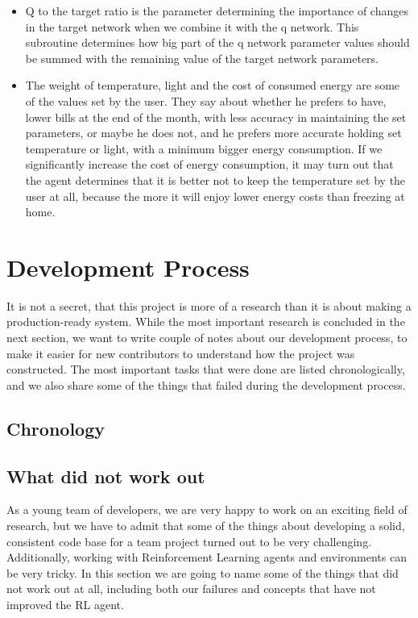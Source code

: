 \documentclass{article}
\begin{document}
\begin{itemize}
\item Q to the target ratio is the parameter determining the importance of changes in the target network when we combine it with the q network. This subroutine determines how big part of the q network parameter values should be summed with the remaining value of the target network parameters.

\item The weight of temperature, light and the cost of consumed energy are some of the values set by the user. They say about whether he prefers to have, lower bills at the end of the month, with less accuracy in maintaining the set parameters, or maybe he does not, and he prefers more accurate holding set temperature or light, with a minimum bigger energy consumption.
If we significantly increase the cost of energy consumption, it may turn out that the agent determines that it is better not to keep the temperature set by the user at all, because the more it will enjoy lower energy costs than freezing at home.
\end{itemize}

\section{Development Process}
It is not a secret, that this project is more of a research than it is about making a production-ready system. While the most important research is concluded in the next section, we want to write couple of notes about our development process, to make it easier for new contributors to understand how the project was constructed. The most important tasks that were done are listed chronologically, and we also share some of the things that failed during the development process.
\subsection{Chronology}
\subsection{What did not work out}
As a young team of developers, we are very happy to work on an exciting field of research, but we have to admit that some of the things about developing a solid, consistent code base for a team project turned out to be very challenging. Additionally, working with Reinforcement Learning agents and environments can be very tricky. In this section we are going to name some of the things that did not work out at all, including both our failures and concepts that have not improved the RL agent. 
\end{document}

